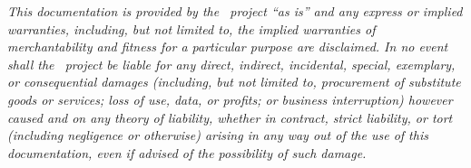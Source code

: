 {\noindent
{\em This documentation is provided by the \Cloudy\ project ``as is'' and any express
or implied warranties, including, but not limited to, the implied warranties
of merchantability and fitness for a particular purpose are disclaimed. In no
event shall the  \Cloudy\  project be liable for any direct, indirect, incidental,
special, exemplary, or consequential damages (including, but not limited to,
procurement of substitute goods or services; loss of use, data, or profits; or
business interruption) however caused and on any theory of liability, whether
in contract, strict liability, or tort (including negligence or otherwise)
arising in any way out of the use of this documentation, even if advised of
the possibility of such damage.}\par
}
